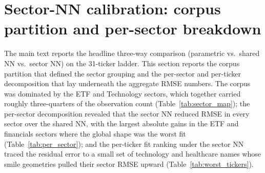 \section{Sector-NN calibration: corpus partition and per-sector breakdown}\label{sec:supp_sector_nn}

The main text reports the headline three-way comparison (parametric vs.\ shared NN vs.\ sector NN) on the 31-ticker ladder. This section reports the corpus partition that defined the sector grouping and the per-sector and per-ticker decomposition that lay underneath the aggregate RMSE numbers. The corpus was dominated by the ETF and Technology sectors, which together carried roughly three-quarters of the observation count (Table~\ref{tab:sector_map}); the per-sector decomposition revealed that the sector NN reduced RMSE in every sector over the shared NN, with the largest absolute gains in the ETF and financials sectors where the global shape was the worst fit (Table~\ref{tab:per_sector}); and the per-ticker fit ranking under the sector NN traced the residual error to a small set of technology and healthcare names whose smile geometries pulled their sector RMSE upward (Table~\ref{tab:worst_tickers}).

\begin{table}[ht]
\centering
\caption{Sector partition of the 31-ticker ladder. Each ticker appeared on at least one of fifteen capture dates (2026-04-14 through 2026-05-11); per-sector observation counts were pooled across dates. ETF observation counts were substantially larger than other sectors because SPY, QQQ, and IWM carried far deeper strike ladders than individual-name chains.}\label{tab:sector_map}
\end{table}

